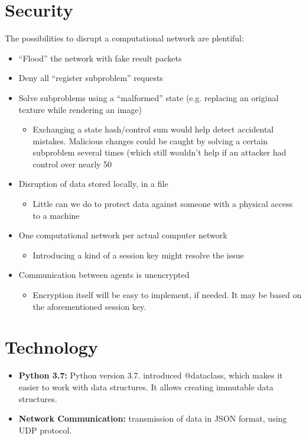 \documentclass{article}
\begin{document}
\section{Security}
The possibilities to disrupt a computational network are plentiful:
\begin{itemize}
    \item “Flood” the network with fake result packets
    \item Deny all “register subproblem” requests
    \item Solve subproblems using a “malformed” state (e.g. replacing an original texture while rendering an image)
    \begin{itemize}
        \item Exchanging a state hash/control sum would help detect accidental mistakes. Malicious changes could be caught by solving a certain subproblem 
        several times (which still wouldn’t help if an attacker had control over nearly 50%
    \end{itemize}
    \item Disruption of data stored locally, in a file
    \begin{itemize}
        \item Little can we do to protect data against someone with a physical access to a machine
    \end{itemize}
    \item One computational network per actual computer network
    \begin{itemize}
        \item Introducing a kind of a session key might resolve the issue
    \end{itemize}
    \item Communication between agents is unencrypted
    \begin{itemize}
        \item Encryption itself will be easy to implement, if needed. It may be based on the aforementioned session key.
    \end{itemize}
\end{itemize}

\section{Technology}
\begin{itemize}
    \item \textbf{Python 3.7:} Python version 3.7. introduced @dataclass, which makes it easier to work with data structures.
    It allows creating immutable data structures.
    \item \textbf{Network Communication:} transmission of data in JSON format, using UDP protocol.
\end{itemize}
\end{document}
